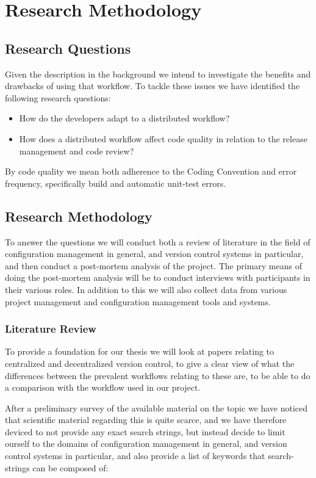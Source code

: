 \documentclass{article}
\begin{document}
\section{Research Methodology}

\subsection{Research Questions}
Given the description in the background we intend to investigate the
benefits and drawbacks of using that workflow. To tackle these issues
we have identified the following research questions:

\begin{itemize}
 \item How do the developers adapt to a distributed workflow?
 \item How does a distributed workflow affect code quality in relation
       to the release management and code review?
\end{itemize}

By code quality we mean both adherence to the Coding Convention and
error frequency, specifically build and automatic unit-test errors.

\subsection{Research Methodology}
To answer the questions we will conduct both a review of literature in
the field of configuration management in general, and version control
systems in particular, and then conduct a post-mortem analysis of the
project. The primary means of doing the post-mortem analysis will be
to conduct interviews with participants in their various roles. In
addition to this we will also collect data from various project
management and configuration management tools and systems.

\subsubsection{Literature Review}
\label{sec:litreview}
To provide a foundation for our thesis we will look at papers relating
to centralized and decentralized version control, to give a clear view
of what the differences between the prevalent workflows relating to
these are, to be able to do a comparison with the workflow used in our
project. 

After a preliminary survey of the available material on the topic we
have noticed that scientific material regarding this is quite scarce,
and we have therefore deviced to not provide any exact search strings,
but instead decide to limit ourself to the domains of configuration
management in general, and version control systems in particular, and
also provide a list of keywords that search-strings can be composed
of:
\end{document}
